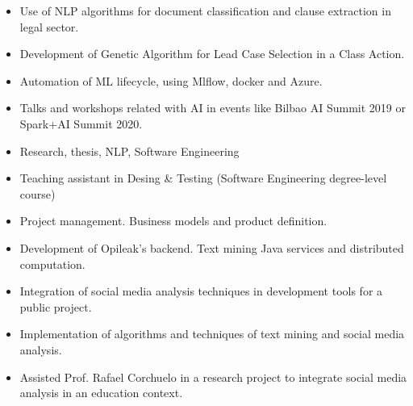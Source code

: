 \documentclass[10pt,a4paper,ragged2e,withhyper]{altacv}
\begin{document}
\begin{paracol}{2}

\begin{itemize}
    \item Use of NLP algorithms for document classification and clause extraction in legal sector.
    \item Development of Genetic Algorithm for Lead Case Selection in a Class Action.
    \item Automation of ML lifecycle, using Mlflow, docker and Azure.
    \item Talks and workshops related with AI in events like Bilbao AI Summit 2019 or Spark+AI Summit 2020.
\end{itemize}

\bigskip

\begin{itemize}
    \item Research, thesis, NLP, Software Engineering
    \item Teaching assistant in Desing \& Testing (Software Engineering degree-level course)
\end{itemize}

\bigskip

\begin{itemize}
    \item Project management. Business models and product definition.
    \item Development of Opileak's backend. Text mining Java services and distributed computation.
    \item Integration of social media analysis techniques in development tools for a public project.
\end{itemize}

\bigskip

\begin{itemize}
    \item Implementation of algorithms and techniques of text mining and social media analysis.
    \item Assisted Prof. Rafael Corchuelo in a research project to integrate social media analysis in an education context.
\end{itemize}


\end{paracol}
\end{document}
